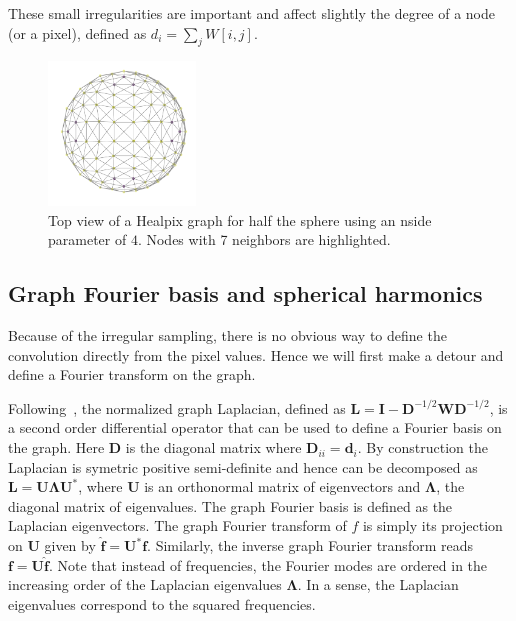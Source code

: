 \documentclass[final,twocolumn,3p,times,authoryear]{elsarticle}
\newcommand{\todo}[1]{{\color[rgb]{.6,.1,.6}{#1}}}
\renewcommand{\b}[1]{{\bm{#1}}}   %
\newcommand{\1}{\b{1}}              %
\newcommand{\0}{\b{0}}              %
\renewcommand{\L}{\b{L}} %
\newcommand{\W}{\b{W}}
\newcommand{\I}{\b{I}}
\newcommand{\D}{\b{D}}
\newcommand{\U}{\b{U}}
\newcommand{\bLambda}{\b{\Lambda}}
\begin{document}
These small irregularities are important and affect slightly the degree of a
node (or a pixel), defined as $d_i =\sum_j W[i,j]$.

\begin{figure}[!ht]
\centering
\vspace{-0.5cm}
\includegraphics[width=0.35\textwidth]{figures/half_graph_4.pdf}
\vspace{-0.5cm}
\caption{
Top view of a Healpix graph for half the sphere using an nside parameter of $4$.
Nodes with 7 neighbors are highlighted. \label{fig:healpix_graph_4}
}

\end{figure}

\subsection{Graph Fourier basis and spherical harmonics}
\todo{Add a few extra references}

Because of the irregular sampling, there is no obvious way to define the convolution
directly from the pixel values. Hence we will first make a detour and define a Fourier transform on the
graph.

Following~\cite{shuman2013emerging}, the normalized graph Laplacian,
defined as $\L = \I - \D^{-1/2} \W \D^{-1/2}$, is a second order differential operator
that can be used to define a Fourier basis on the graph. Here $\D$ is the diagonal
matrix where $\D_{ii}=\b{d}_i$. By construction the Laplacian is symetric positive
semi-definite and hence can be decomposed as $\L=\U \bLambda \U^*$, where $\U$ is an
orthonormal matrix of eigenvectors and $\bLambda$, the diagonal matrix of
eigenvalues. The graph Fourier basis is defined as the Laplacian eigenvectors.
The graph Fourier transform of $f$ is simply its projection on $\U$ given by
$\hat{\b{f}}=\U^*\b{f}$. Similarly, the inverse graph Fourier transform reads $\b{f}=\U\hat{\b{f}}$.
Note that instead of frequencies, the Fourier modes are ordered in the increasing order of the Laplacian eigenvalues $\bLambda$. In a sense, the Laplacian
eigenvalues correspond to the squared frequencies.
\end{document}

